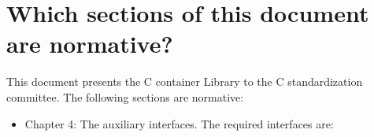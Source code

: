 \section{Which sections of this document are normative?}
This document presents the C container Library to the C standardization committee. The following sections are normative:
\begin{itemize}
\item Chapter 4: The auxiliary interfaces. The required interfaces are:


\end{itemize}
